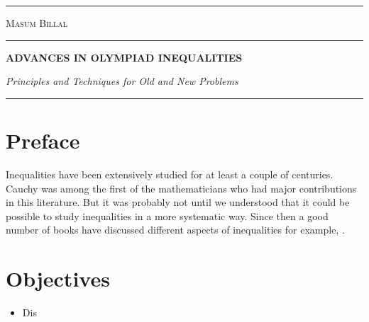 \documentclass[a4paper, 12pt]{book}
\newlength{\drop}
\newlength{\tpheight}\setlength{\tpheight}{0.9\textheight}
\newlength{\txtheight}\setlength{\txtheight}{0.9\tpheight}
\newlength{\tpwidth}\setlength{\tpwidth}{0.9\textwidth}
\newlength{\txtwidth}\setlength{\txtwidth}{0.9\tpwidth}
\theoremstyle{definition}
\theoremstyle{definition}
\numberwithin{problem}{chapter}
\begin{document}
	\frontmatter
	\pagestyle{empty}
	\pagecolor{platinum}
	\begin{titlepage}
		\txtheight
		\begin{minipage}[t]{0.05\txtwidth}
			\color{black}
			\rule{6pt}{\txtheight}
		\end{minipage}
		\hspace{0.05\txtwidth}
		\begin{minipage}[t]{2\txtwidth}
			\vspace*{\drop}
			{\Large {\scshape Masum Billal} %
			}
			\\
			\rule{1\txtwidth}{1pt} \par
			\vspace{3\baselineskip}
			{\noindent\bfseries ADVANCES IN OLYMPIAD INEQUALITIES} \par
			\vspace{2\baselineskip}
			{\large\itshape Principles and Techniques for Old and New Problems} \par
			\vspace{6.5\baselineskip}
			{\scshape } \par
			\vspace{0.1\baselineskip}
			{\Large } \par
			\vspace{\baselineskip}
			\rule{\txtwidth}{1pt} \par
			\vspace{\baselineskip}
			{\Large }
		\end{minipage}
		\hfill
	\end{titlepage}

		\section*{Preface}

		Inequalities have been extensively studied for at least a couple of centuries. Cauchy was among the first of the mathematicians who had major contributions in this literature. But it was probably not until \textcite{hardy_littlewood_polya_1934} we understood that it could be possible to study inequalities in a more systematic way. Since then a good number of books have discussed different aspects of inequalities for example, \textcite{beckenbach_bellman_1983}.

		\section*{Objectives}
			\begin{itemize}
				\item Dis
			\end{itemize}
	\newpage
	\tableofcontents
	\mainmatter
	\pagestyle{fancyplain}
\end{document}

